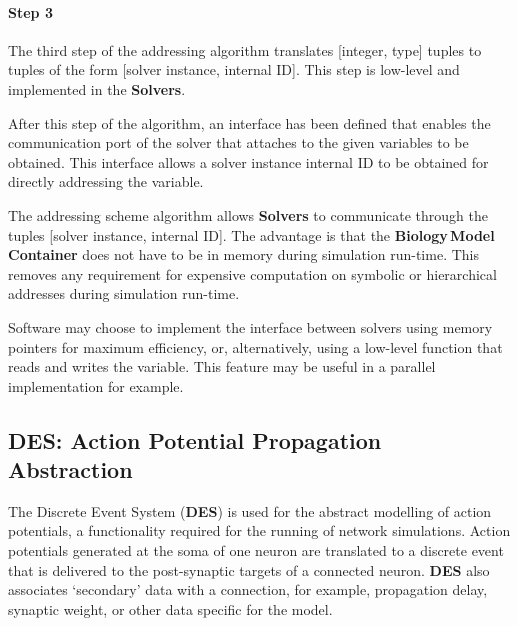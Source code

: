 \documentclass{article}
\begin{document}


\paragraph{Step 3} The third step of the addressing algorithm
translates [integer, type] tuples to tuples of the form [solver
instance, internal ID].  This step is low-level and implemented in the
{\bf Solvers}.

After this step of the algorithm, an interface has been defined that enables
the communication port of the solver that attaches to the given
variables to be obtained.  This interface allows a solver instance
internal ID to be obtained for directly addressing the variable.

The addressing scheme algorithm allows {\bf Solvers} to communicate
through the tuples [solver instance, internal ID].  The advantage is
that the {\bf Biology\,Model\,Container} does not have to be in memory
during simulation run-time.  This removes any requirement for
expensive computation on symbolic or hierarchical addresses during
simulation run-time.

Software may choose to implement the interface between solvers using
memory pointers for maximum efficiency, or, alternatively, using a
low-level function that reads and writes the variable.  This feature
may be useful in a parallel implementation for example.



\subsection{DES: Action Potential Propagation Abstraction}

The Discrete Event System ({\bf DES}) is used for the abstract
modelling of action potentials, a functionality required for the
running of network simulations.  Action potentials generated at the
soma of one neuron are translated to a discrete event that is
delivered to the post-synaptic targets of a connected neuron.  {\bf
  DES} also associates `secondary' data with a connection, for
example, propagation delay, synaptic weight, or other data specific
for the model.
\end{document}
